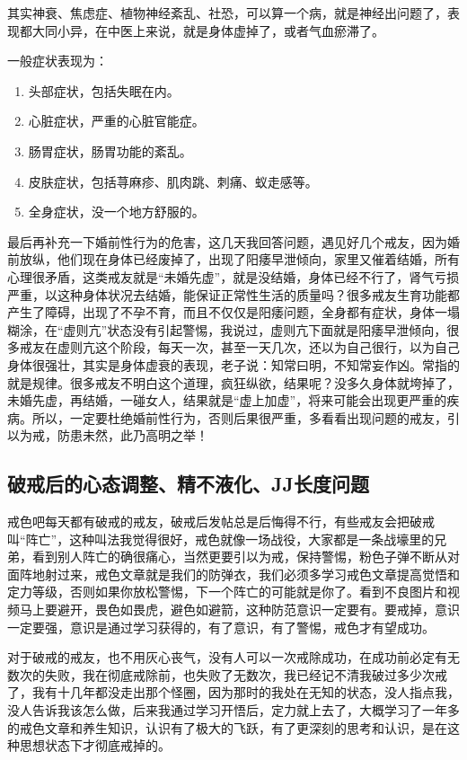 \documentclass{ctexart}
\begin{document}
其实神衰、焦虑症、植物神经紊乱、社恐，可以算一个病，就是神经出问题了，表现都大同小异，在中医上来说，就是身体虚掉了，或者气血瘀滞了。


一般症状表现为：
\begin{enumerate}
    \item 头部症状，包括失眠在内。
    \item 心脏症状，严重的心脏官能症。
    \item 肠胃症状，肠胃功能的紊乱。
    \item 皮肤症状，包括荨麻疹、肌肉跳、刺痛、蚁走感等。
    \item 全身症状，没一个地方舒服的。
\end{enumerate}

最后再补充一下婚前性行为的危害，这几天我回答问题，遇见好几个戒友，因为婚前放纵，他们现在身体已经废掉了，出现了阳痿早泄倾向，家里又催着结婚，所有心理很矛盾，这类戒友就是“未婚先虚”，就是没结婚，身体已经不行了，肾气亏损严重，以这种身体状况去结婚，能保证正常性生活的质量吗？很多戒友生育功能都产生了障碍，出现了不孕不育，而且不仅仅是阳痿问题，全身都有症状，身体一塌糊涂，在“虚则亢”状态没有引起警惕，我说过，虚则亢下面就是阳痿早泄倾向，很多戒友在虚则亢这个阶段，每天一次，甚至一天几次，还以为自己很行，以为自己身体很强壮，其实是身体虚衰的表现，老子说：知常曰明，不知常妄作凶。常指的就是规律。很多戒友不明白这个道理，疯狂纵欲，结果呢？没多久身体就垮掉了，未婚先虚，再结婚，一碰女人，结果就是“虚上加虚”，将来可能会出现更严重的疾病。所以，一定要杜绝婚前性行为，否则后果很严重，多看看出现问题的戒友，引以为戒，防患未然，此乃高明之举！

\subsection{破戒后的心态调整、精不液化、JJ长度问题}

戒色吧每天都有破戒的戒友，破戒后发帖总是后悔得不行，有些戒友会把破戒叫“阵亡”，这种叫法我觉得很好，戒色就像一场战役，大家都是一条战壕里的兄弟，看到别人阵亡的确很痛心，当然更要引以为戒，保持警惕，粉色子弹不断从对面阵地射过来，戒色文章就是我们的防弹衣，我们必须多学习戒色文章提高觉悟和定力等级，否则如果你放松警惕，下一个阵亡的可能就是你了。看到不良图片和视频马上要避开，畏色如畏虎，避色如避箭，这种防范意识一定要有。要戒掉，意识一定要强，意识是通过学习获得的，有了意识，有了警惕，戒色才有望成功。

对于破戒的戒友，也不用灰心丧气，没有人可以一次戒除成功，在成功前必定有无数次的失败，我在彻底戒除前，也失败了无数次，我已经记不清我破过多少次戒了，我有十几年都没走出那个怪圈，因为那时的我处在无知的状态，没人指点我，没人告诉我该怎么做，后来我通过学习开悟后，定力就上去了，大概学习了一年多的戒色文章和养生知识，认识有了极大的飞跃，有了更深刻的思考和认识，是在这种思想状态下才彻底戒掉的。
\end{document}
